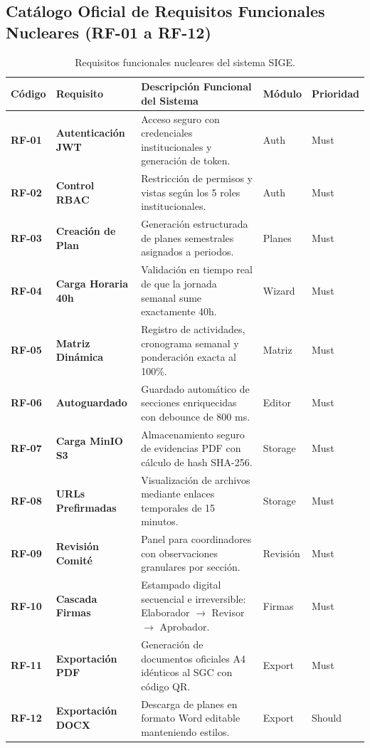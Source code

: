\documentclass[12pt,a4paper]{article}
\begin{document}
\subsection{Catálogo Oficial de Requisitos Funcionales Nucleares (RF-01 a RF-12)}
\begin{table}[H]
\centering
\small
\renewcommand{\arraystretch}{1.15}
\begin{tabularx}{\textwidth}{|>{\hsize=0.3\hsize\centering\arraybackslash\footnotesize}X|>{\hsize=0.8\hsize\raggedright\arraybackslash\bfseries\footnotesize}X|>{\hsize=1.9\hsize\raggedright\arraybackslash\footnotesize}X|>{\hsize=0.5\hsize\centering\arraybackslash\footnotesize}X|>{\hsize=0.5\hsize\centering\arraybackslash\footnotesize}X|}
\hline
\rowcolor{tableheader}
\textbf{Código} & \textbf{Requisito} & \textbf{Descripción Funcional del Sistema} & \textbf{Módulo} & \textbf{Prioridad} \\
\hline
\textbf{RF-01} & Autenticación JWT & Acceso seguro con credenciales institucionales y generación de token. & Auth & Must \\
\hline
\textbf{RF-02} & Control RBAC & Restricción de permisos y vistas según los 5 roles institucionales. & Auth & Must \\
\hline
\textbf{RF-03} & Creación de Plan & Generación estructurada de planes semestrales asignados a periodos. & Planes & Must \\
\hline
\textbf{RF-04} & Carga Horaria 40h & Validación en tiempo real de que la jornada semanal sume exactamente 40h. & Wizard & Must \\
\hline
\textbf{RF-05} & Matriz Dinámica & Registro de actividades, cronograma semanal y ponderación exacta al 100\%. & Matriz & Must \\
\hline
\textbf{RF-06} & Autoguardado & Guardado automático de secciones enriquecidas con debounce de 800 ms. & Editor & Must \\
\hline
\textbf{RF-07} & Carga MinIO S3 & Almacenamiento seguro de evidencias PDF con cálculo de hash SHA-256. & Storage & Must \\
\hline
\textbf{RF-08} & URLs Prefirmadas & Visualización de archivos mediante enlaces temporales de 15 minutos. & Storage & Must \\
\hline
\textbf{RF-09} & Revisión Comité & Panel para coordinadores con observaciones granulares por sección. & Revisión & Must \\
\hline
\textbf{RF-10} & Cascada Firmas & Estampado digital secuencial e irreversible: Elaborador $\to$ Revisor $\to$ Aprobador. & Firmas & Must \\
\hline
\textbf{RF-11} & Exportación PDF & Generación de documentos oficiales A4 idénticos al SGC con código QR. & Export & Must \\
\hline
\textbf{RF-12} & Exportación DOCX & Descarga de planes en formato Word editable manteniendo estilos. & Export & Should \\
\hline
\end{tabularx}
\caption{Requisitos funcionales nucleares del sistema SIGE.}
\label{tab:rf_nucleares}
\end{table}
\end{document}
